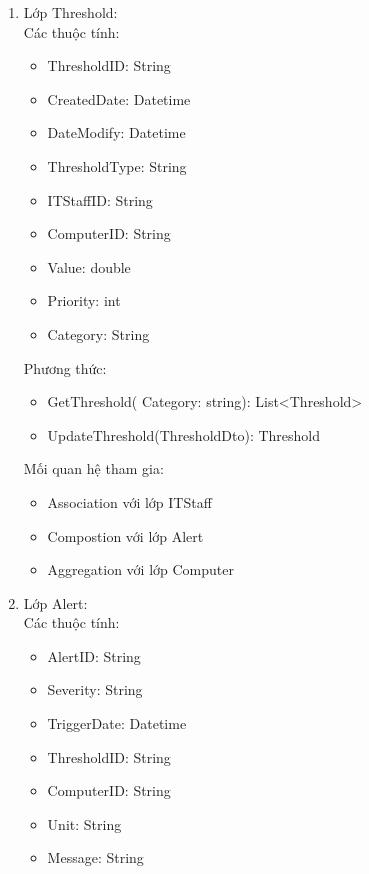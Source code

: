 \begin{enumerate}
    Mối quan hệ tham gia:
    \begin{itemize}[label=--]
        \item Association với lớp ITStaff
    \end{itemize}
    \item Lớp Threshold:\\
    Các thuộc tính:
    \begin{itemize}[label=--]
        \item ThresholdID: String
        \item CreatedDate: Datetime
        \item DateModify: Datetime
        \item ThresholdType: String
        \item ITStaffID: String
        \item ComputerID: String 
        \item Value: double
        \item Priority: int
        \item Category: String
    \end{itemize}
    Phương thức:
    \begin{itemize}[label=--]
        \item GetThreshold( Category: string): List<Threshold>
        \item UpdateThreshold(ThresholdDto): Threshold
    \end{itemize}
    Mối quan hệ tham gia:
    \begin{itemize}[label=--]
        \item Association với lớp ITStaff
        \item Compostion với lớp Alert
        \item Aggregation với lớp Computer
    \end{itemize}
    \item Lớp Alert:\\
    Các thuộc tính:
    \begin{itemize}[label=--]
        \item AlertID: String
        \item Severity: String
        \item TriggerDate: Datetime
        \item ThresholdID: String
        \item ComputerID: String
        \item Unit: String
        \item Message: String

\end{itemize}
\end{enumerate}
